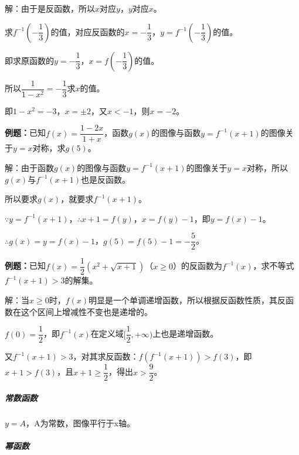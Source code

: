 \documentclass[UTF8, 12pt]{ctexart}
\begin{document}
解：由于是反函数，所以$x$对应$y$，$y$对应$x$。

求$f^{-1}(-\dfrac{1}{3})$的值，对应反函数的$x=-\dfrac{1}{3}$，$y=f^{-1}(-\dfrac{1}{3})$的值。

即求原函数的$y=-\dfrac{1}{3}$，$x=f(-\dfrac{1}{3})$的值。

所以$\dfrac{1}{1-x^2}=-\dfrac{1}{3}$求$x$的值。

即$1-x^2=-3$，$x=\pm2$，又$x<-1$，则$x=-2$。

\textbf{例题：}已知$f(x)=\dfrac{1-2x}{1+x}$，函数$g(x)$的图像与函数$y=f^{-1}(x+1)$的图像关于$y=x$对称，求$g(5)$。

解：由于函数$g(x)$的图像与函数$y=f^{-1}(x+1)$的图像关于$y=x$对称，所以$g(x)$与$f^{-1}(x+1)$也是反函数。

所以要求$g(x)$，就要求$f^{-1}(x+1)$。

$\because y=f^{-1}(x+1)$，$\therefore x+1=f(y)$，$x=f(y)-1$，即$y=f(x)-1$。

$\therefore g(x)=y=f(x)-1$，$g(5)=f(5)-1=-\dfrac{5}{2}$。

\textbf{例题：}已知$f(x)=\dfrac{1}{2}(x^2+\sqrt{x+1})$（$x\geqslant0$）的反函数为$f^{-1}(x)$，求不等式$f^{-1}(x+1)>3$的解集。

解：当$x\geqslant0$时，$f(x)$明显是一个单调递增函数，所以根据反函数性质，其反函数在这个区间上增减性不变也是递增的。

$f(0)=\dfrac{1}{2}$，即$f^{-1}(x)$在定义域$[\dfrac{1}{2},+\infty)$上也是递增函数。

又$f^{-1}(x+1)>3$，对其求反函数：$f(f^{-1}(x+1))>f(3)$，即$x+1>f(3)$，且$x+1\geqslant\dfrac{1}{2}$，得出$x>\dfrac{9}{2}$。

\subparagraph{常数函数} \leavevmode \medskip

\begin{minipage}{0.35\linewidth}
    $y=A$，A为常数，图像平行于x轴。
\end{minipage}
\hfill
\begin{minipage}{0.55\linewidth}
\end{minipage}

\subparagraph{幂函数} \leavevmode \medskip
\end{document}
